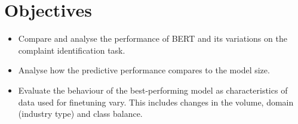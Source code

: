 \section{Objectives}

\begin{itemize}
    \item Compare and analyse the performance of BERT and its variations on the complaint identification task.
    \item Analyse how the predictive performance compares to the model size.
    \item Evaluate the behaviour of the best-performing model as characteristics of data used for finetuning vary. This includes changes in the volume, domain (industry type) and class balance.
\end{itemize}

